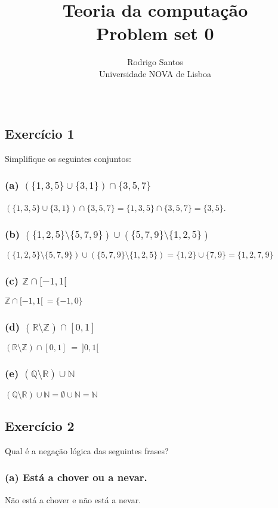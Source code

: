 \documentclass{article}
\title{Teoria da computação \large \\ Problem set 0}
\author{Rodrigo Santos\\
  \small Universidade NOVA de Lisboa\\\\
}
\date{\vspace{-5ex}}
\begin{document}
\maketitle

\subsection*{Exercício 1}
Simplifique os seguintes conjuntos:

\subsubsection*{(a) $(\{1,3,5\} \cup \{3,1\}) \cap \{3,5,7\} $}
$(\{1,3,5\} \cup \{3,1\}) \cap \{3,5,7\} = \{1,3,5\} \cap \{3,5,7\} = \{3,5\}$.

\subsubsection*{(b) $(\{1,2,5\} \setminus \{5,7,9\}) \cup (\{5,7,9\} \setminus \{1,2,5\})$}
$(\{1,2,5\} \setminus \{5,7,9\}) \cup (\{5,7,9\} \setminus \{1,2,5\}) = \{1,2\} \cup \{7,9\} = \{1,2,7,9\}$

\subsubsection*{(c) $\mathbb{Z} \cap [-1,1[ $}
$\mathbb{Z} \cap [-1,1[ \ = \{-1,0\}$

\subsubsection*{(d) $(\mathbb{R} \setminus \mathbb{Z}) \cap [0,1] $}
$(\mathbb{R} \setminus \mathbb{Z}) \cap [0,1] \ = \ ]0,1[$

\subsubsection*{(e) $(\mathbb{Q} \setminus \mathbb{R}) \cup \mathbb{N}$}
$(\mathbb{Q} \setminus \mathbb{R}) \cup \mathbb{N} = \emptyset \cup \mathbb{N} = \mathbb{N}$

\subsection*{Exercício 2}
Qual é a negação lógica das seguintes frases?

\subsubsection*{(a) Está a chover ou a nevar.}
Não está a chover e não está a nevar.
\end{document}
